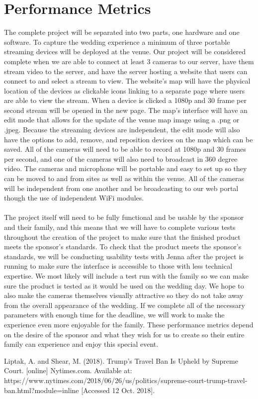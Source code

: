 \documentclass[onecolumn, draftclsnofoot,10pt, compsoc]{IEEEtran}
\begin{document}
\section{Performance Metrics}
The complete project will be separated into two parts, one hardware and one software.
To capture the wedding experience a minimum of three portable streaming devices will be deployed at the venue. 
Our project will be considered complete when we are able to connect at least 3 cameras to our server, have them stream video to the server, and have the server hosting a website that users can connect to and select a stream to view. 
The website's map will have the physical location of the devices as clickable icons linking to a separate page where users are able to view the stream. 
When a device is clicked a 1080p and 30 frame per second stream will be opened in the new page. 
The map’s interface will have an edit mode that allows for the update of the venue map image using a .png or .jpeg. 
Because the streaming devices are independent, the edit mode will also have the options to add, remove, and reposition devices on the map which can be saved. 
All of the cameras will need to be able to record at 1080p and 30 frames per second, and one of the cameras will also need to broadcast in 360 degree video.
The cameras and microphone will be portable and easy to set up so they can be moved to and from sites as well as within the venue. 
All of the cameras will be independent from one another and be broadcasting to our web portal though the use of independent WiFi modules. 
\\
\\
The project itself will need to be fully functional and be usable by the sponsor and their family, and this means that we will have to complete various tests throughout the creation of the project to make sure that the finished product meets the sponsor's standards.
To check that the product meets the sponsor's standards, we will be conducting usability tests with Jenna after the project is running to make sure the interface is accessible to those with less technical expertise. 
We most likely will include a test run with the family so we can make sure the product is tested as it would be used on the wedding day. 
We hope to also make the cameras themselves visually attractive so they do not take away from the overall appearance of the wedding. 
If we complete all of the necessary parameters with enough time for the deadline, we will work to make the experience even more enjoyable for the family. 
These performance metrics depend on the desire of the sponsor and what they wish for us to create so their entire family can experience and enjoy this special event. 

\begin{thebibliography}{1}

 Liptak, A. and Shear, M. (2018). Trump’s Travel Ban Is Upheld by Supreme Court. [online] Nytimes.com. Available at: https://www.nytimes.com/2018/06/26/us/politics/supreme-court-trump-travel-ban.html?module=inline [Accessed 12 Oct. 2018].

\end{thebibliography}
\end{document}
